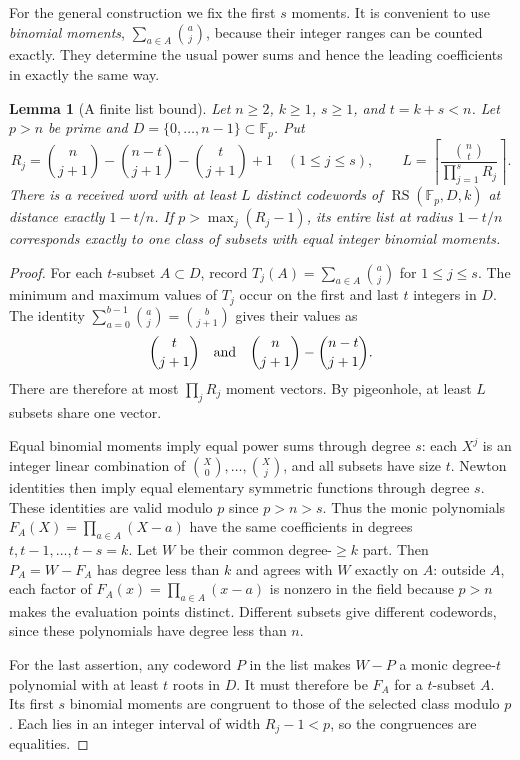 \documentclass[11pt,letterpaper]{article}
\newtheorem{lemma}[theorem]{Lemma}
\theoremstyle{definition}
\theoremstyle{remark}
\newcommand{\F}{\mathbb F}
\newcommand{\RS}{\operatorname{RS}}
\begin{document}
For the general construction we fix the first $s$ moments. It is convenient
to use \emph{binomial moments}, $\sum_{a\in A}\binom aj$, because their
integer ranges can be counted exactly. They determine the usual power sums
and hence the leading coefficients in exactly the same way.

\begin{lemma}[A finite list bound]\label{im:finite-list}
Let $n\ge2$, $k\ge1$, $s\ge1$, and $t=k+s<n$. Let $p>n$ be prime and
$D=\{0,\ldots,n-1\}\subset\F_p$. Put
\[
 R_j=\binom n{j+1}-\binom{n-t}{j+1}-\binom t{j+1}+1
 \quad(1\le j\le s),\qquad
 L=\left\lceil\frac{\binom nt}{\prod_{j=1}^sR_j}\right\rceil.
\]
There is a received word with at least $L$ distinct codewords of
$\RS(\F_p,D,k)$ at distance exactly $1-t/n$.
If $p>\max_j(R_j-1)$, its entire list at radius $1-t/n$ corresponds
exactly to one class of subsets with equal integer binomial moments.
\end{lemma}
\begin{proof}
For each $t$-subset $A\subset D$, record
$T_j(A)=\sum_{a\in A}\binom aj$ for $1\le j\le s$.
The minimum and maximum values of $T_j$ occur on the first and last $t$
integers in $D$. The identity
$\sum_{a=0}^{b-1}\binom aj=\binom b{j+1}$ gives their values as
\[
 \binom t{j+1}\quad\hbox{and}\quad
 \binom n{j+1}-\binom{n-t}{j+1}.
\]
There are therefore at most $\prod_jR_j$ moment vectors. By pigeonhole,
at least $L$ subsets share one vector.

Equal binomial moments imply equal power sums through degree $s$: each
$X^j$ is an integer linear combination of
$\binom X0,\ldots,\binom Xj$, and all subsets have size $t$.
Newton identities then imply equal elementary symmetric functions through
degree $s$. These identities are valid modulo $p$ since $p>n>s$.
Thus the monic polynomials $F_A(X)=\prod_{a\in A}(X-a)$ have the same
coefficients in degrees $t,t-1,\ldots,t-s=k$. Let $W$ be their common
degree-$\ge k$ part. Then $P_A=W-F_A$ has degree less than $k$ and
agrees with $W$ exactly on $A$: outside $A$, each factor of
$F_A(x)=\prod_{a\in A}(x-a)$ is nonzero in the field because
$p>n$ makes the evaluation points distinct. Different subsets give different codewords,
since these polynomials have degree less than $n$.

For the last assertion, any codeword $P$ in the list makes $W-P$ a monic
degree-$t$ polynomial with at least $t$ roots in $D$. It must therefore be
$F_A$ for a $t$-subset $A$. Its first $s$ binomial moments are congruent
to those of the selected class modulo $p$. Each lies in an integer interval
of width $R_j-1<p$, so the congruences are equalities.
\end{proof}
\end{document}
